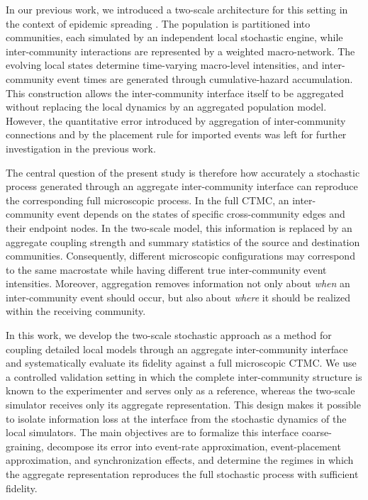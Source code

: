 \documentclass[a4paper,fleqn]{cas-sc}
\begin{document}
In our previous work, we introduced a two-scale architecture for this setting in the context of epidemic spreading \cite{kuryliak2025twoscale}. The population is partitioned into communities, each simulated by an independent local stochastic engine, while inter-community interactions are represented by a weighted macro-network. The evolving local states determine time-varying macro-level intensities, and inter-community event times are generated through cumulative-hazard accumulation. This construction allows the inter-community interface itself to be aggregated without replacing the local dynamics by an aggregated population model. However, the quantitative error introduced by aggregation of inter-community connections and by the placement rule for imported events was left for further investigation in the previous work.

The central question of the present study is therefore how accurately a stochastic process generated through an aggregate inter-community interface can reproduce the corresponding full microscopic process. In the full CTMC, an inter-community event depends on the states of specific cross-community edges and their endpoint nodes. In the two-scale model, this information is replaced by an aggregate coupling strength and summary statistics of the source and destination communities. Consequently, different microscopic configurations may correspond to the same macrostate while having different true inter-community event intensities. Moreover, aggregation removes information not only about \emph{when} an inter-community event should occur, but also about \emph{where} it should be realized within the receiving community.

In this work, we develop the two-scale stochastic approach as a method for coupling detailed local models through an aggregate inter-community interface and systematically evaluate its fidelity against a full microscopic CTMC. We use a controlled validation setting in which the complete inter-community structure is known to the experimenter and serves only as a reference, whereas the two-scale simulator receives only its aggregate representation. This design makes it possible to isolate information loss at the interface from the stochastic dynamics of the local simulators. The main objectives are to formalize this interface coarse-graining, decompose its error into event-rate approximation, event-placement approximation, and synchronization effects, and determine the regimes in which the aggregate representation reproduces the full stochastic process with sufficient fidelity.
\end{document}

